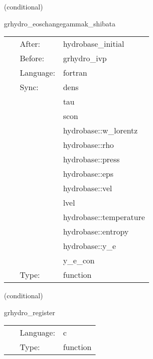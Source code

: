 \documentclass{article}
\begin{document}
\vspace{5mm}

   (conditional) 

\hspace{5mm} grhydro\_eoschangegammak\_shibata 

\hspace{5mm}{\it reset the hydro variables if the eos gamma and k change between id and evolution } 


\hspace{5mm}

 \begin{tabular*}{160mm}{cll} 
~ & After:  & hydrobase\_initial \\ 
~ & Before:  & grhydro\_ivp \\ 
~ & Language:  & fortran \\ 
~ & Sync:  & dens \\ 
~& ~ &tau\\ 
~& ~ &scon\\ 
~& ~ &hydrobase::w\_lorentz\\ 
~& ~ &hydrobase::rho\\ 
~& ~ &hydrobase::press\\ 
~& ~ &hydrobase::eps\\ 
~& ~ &hydrobase::vel\\ 
~& ~ &lvel\\ 
~& ~ &hydrobase::temperature\\ 
~& ~ &hydrobase::entropy\\ 
~& ~ &hydrobase::y\_e\\ 
~& ~ &y\_e\_con\\ 
~ & Type:  & function \\ 
\end{tabular*} 


\vspace{5mm}

   (conditional) 

\hspace{5mm} grhydro\_register 

\hspace{5mm}{\it register variables for mol } 


\hspace{5mm}

 \begin{tabular*}{160mm}{cll} 
~ & Language:  & c \\ 
~ & Type:  & function \\ 
\end{tabular*} 
\end{document}
